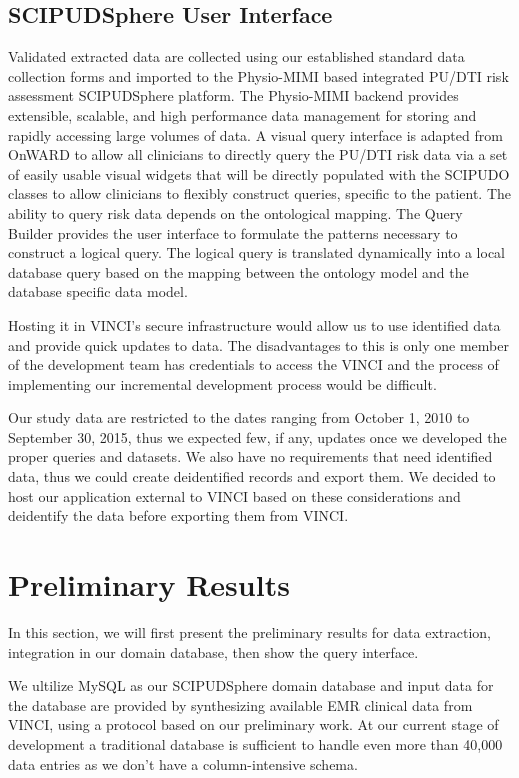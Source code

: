 \documentclass{amia}
\begin{document}
\subsection{SCIPUDSphere User Interface}
Validated extracted data are collected using our established standard data collection forms and imported to the Physio-MIMI based integrated PU/DTI risk assessment SCIPUDSphere platform. The Physio-MIMI backend provides extensible, scalable, and high performance data management for storing and rapidly accessing large volumes of data. A visual query interface is adapted from OnWARD to allow all clinicians to directly query the PU/DTI risk data via a set of easily usable visual widgets that will be directly populated with the SCIPUDO classes to allow clinicians to flexibly construct queries, specific to the patient. The ability to query risk data depends on the ontological mapping. The Query Builder provides the user interface to formulate the patterns necessary to construct a logical query. The logical query is translated dynamically into a local database query based on the mapping between the ontology model and the database specific data model.

Hosting it in VINCI's secure infrastructure would allow us to use identified data and provide quick updates to data. The disadvantages to this is only one member of the development team has credentials to access the VINCI and the process of implementing our incremental development process would be difficult.

Our study data are restricted to the dates ranging from October 1, 2010 to September 30, 2015, thus we expected few, if any, updates once we developed the proper queries and datasets.  We also have no requirements that need identified data, thus we could create deidentified records and export them.  We decided to host our application external to VINCI based on these considerations and deidentify the data before exporting them from VINCI.

\section{Preliminary Results}
In this section, we will first present the preliminary results for data extraction, integration in our domain database, then show the query interface.  

We ultilize MySQL as our SCIPUDSphere domain database and input data for the database are provided by synthesizing available EMR clinical data from VINCI, using a protocol based on our preliminary work. At our current stage of development a traditional database is sufficient to handle even more than 40,000 data entries as we don't have a column-intensive schema.
\end{document}
